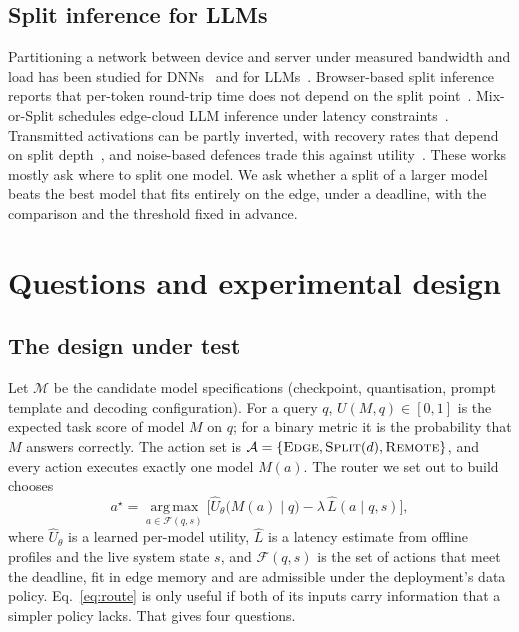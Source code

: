 \documentclass[lettersize,journal]{IEEEtran}
\begin{document}
\subsection{Split inference for LLMs}
Partitioning a network between device and server under measured bandwidth and load has been studied for DNNs~\cite{kang2017neurosurgeon,li2020edgent,laskaridis2020spinn,matsubara2022splitsurvey} and for LLMs~\cite{chen2025adaptivesplit,younesi2025splitwise,mudvari2024splitllm}. Browser-based split inference reports that per-token round-trip time does not depend on the split point~\cite{lee2026browser}. Mix-or-Split schedules edge-cloud LLM inference under latency constraints~\cite{wang2026mix}. Transmitted activations can be partly inverted, with recovery rates that depend on split depth~\cite{cunningham2026privacy}, and noise-based defences trade this against utility~\cite{Mai2023}. These works mostly ask where to split one model. We ask whether a split of a larger model beats the best model that fits entirely on the edge, under a deadline, with the comparison and the threshold fixed in advance.

\section{Questions and experimental design}
\label{sec:design}

\subsection{The design under test}
\label{sec:problem}
Let $\mathcal{M}$ be the candidate model specifications (checkpoint, quantisation, prompt template and decoding configuration). For a query $q$, $U(M,q)\in[0,1]$ is the expected task score of model $M$ on $q$; for a binary metric it is the probability that $M$ answers correctly. The action set is $\mathcal{A}=\{\textsc{Edge},\textsc{Split}(d),\textsc{Remote}\}$, and every action executes exactly one model $M(a)$. The router we set out to build chooses
\begin{equation}
a^{\star}=\operatorname*{arg\,max}_{a\in\mathcal{F}(q,s)}\Big[\hat U_\theta\big(M(a)\mid q\big)-\lambda\,\hat L(a\mid q,s)\Big],
\label{eq:route}
\end{equation}
where $\hat U_\theta$ is a learned per-model utility, $\hat L$ is a latency estimate from offline profiles and the live system state $s$, and $\mathcal{F}(q,s)$ is the set of actions that meet the deadline, fit in edge memory and are admissible under the deployment's data policy. Eq.~\eqref{eq:route} is only useful if both of its inputs carry information that a simpler policy lacks. That gives four questions.
\end{document}

